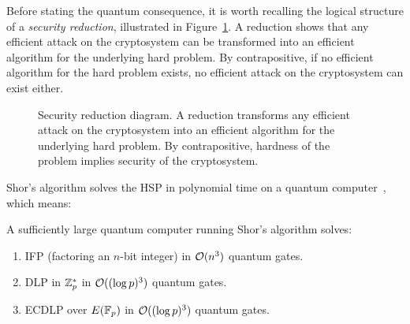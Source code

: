 Before stating the quantum consequence, it is worth recalling the logical structure of a \emph{security reduction}, illustrated in Figure~\ref{fig:ch03-security-reduction}.  A reduction shows that any efficient attack on the cryptosystem can be transformed into an efficient algorithm for the underlying hard problem.  By contrapositive, if no efficient algorithm for the hard problem exists, no efficient attack on the cryptosystem can exist either.

\begin{figure}[t]
\centering
{}
\caption{Security reduction diagram.  A reduction transforms any efficient attack on the cryptosystem into an efficient algorithm for the underlying hard problem.  By contrapositive, hardness of the problem implies security of the cryptosystem.}
\label{fig:ch03-security-reduction}
\end{figure}

Shor's algorithm solves the HSP in polynomial time on a quantum computer~\cite{Shor1997}, which means:

\begin{theorem}
\label{thm:quantum-collapse}
A sufficiently large quantum computer running Shor's algorithm solves:
\begin{enumerate}
\item IFP (factoring an $n$-bit integer) in $\mathcal{O}(n^3)$ quantum gates.
\item DLP in $\mathbb{Z}_p^*$ in $\mathcal{O}((\log p)^3)$ quantum gates.
\item ECDLP over $E(\mathbb{F}_p)$ in $\mathcal{O}((\log p)^3)$ quantum gates.
\end{enumerate}
\end{theorem}

